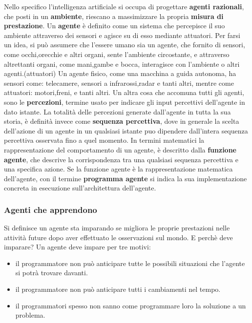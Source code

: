 \documentclass[14pt]{extarticle}
\begin{document}
Nello specifico l'intelligenza artificiale si occupa di progettare \textbf{agenti razionali}, che posti in un \textbf{ambiente}, riescano a massimizzare la propria \textbf{misura di prestazione}.\cite{russell2005intelligenza}
Un \textbf{agente} è definito  come un sistema che percepisce il suo ambiente attraverso dei sensori e agisce su di esso mediante attuatori. Per farsi un idea, si può assumere che l'essere umano sia un agente, che fornito di sensori, come occhi,orecchie e altri organi, sente l'ambiente circostante, e attraverso altrettanti organi, come mani,gambe e bocca, interagisce con l'ambiente o altri agenti.(attuatori)
Un agente fisico, come una macchina a guida autonoma, ha sensori come: telecamere, sensori a infrarossi,radar e tanti altri, mentre come attuatori: motori,freni, e tanti altri. 
Un altra cosa che accomuna tutti gli agenti, sono le  \textbf{percezioni}, termine usato per indicare gli input percettivi dell'agente in dato istante.\cite{russell2005intelligenza}
La totalità delle percezioni generate dall'agente in tutta la sua storia, è definità invece come \textbf{sequenza percettiva}, dove in generale la scelta dell'azione di un agente in un qualsiasi istante puo dipendere dall'intera sequenza percettiva osservata fino a quel momento.
In termini matematici la rappresentazione del comportamento di un agente, è descritto dalla \textbf{funzione agente}, che descrive la corrispondenza tra una qualsiasi sequenza percettiva e una specifica azione.
Se la funzione agente è la rappresentazione matematica dell'agente, con il termine \textbf{programma agente} si indica la sua implementazione concreta  in  esecuzione sull'architettura dell'agente.  \cite{russell2005intelligenza}
\subsubsection{Agenti che apprendono}
Si definisce un agente sta imparando se migliora le proprie prestazioni nelle attività future dopo aver effettuato le osservazioni
sul mondo. \cite{russell2005intelligenza}
E perchè deve imparare?
Un agente deve impare per tre motivi:
\begin{itemize}
\item  il programmatore non può anticipare tutte le possibili situazioni che l'agente si potrà trovare davanti.
\item il programmatore non può anticipare tutti i cambiamenti nel tempo.
\item il programmatori spesso non sanno come programmare loro la soluzione a un problema.
\end{itemize}\cite{russell2005intelligenza}
\end{document}
